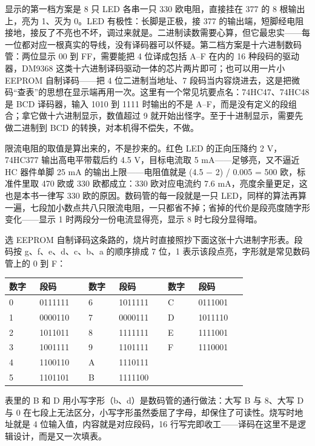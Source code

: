 显示的第一档方案是 8 只 LED 各串一只 330 欧电阻，直接挂在 377 的 8 根输出上，亮为 1、灭为 0。LED 有极性：长脚是正极，接 377 的输出端，短脚经电阻接地，接反了不亮也不坏，调过来就是。二进制读数需要心算，但它最忠实——每一位都对应一根真实的导线，没有译码器可以怀疑。第二档方案是十六进制数码管：两位显示 00 到 FF，需要能把 4 位译成包括 A–F 在内的 16 种段码的驱动器，DM9368 这类十六进制译码驱动一体的芯片两片即可；也可以用一片小 EEPROM 自制译码——把 4 位二进制当地址、7 段码当内容烧进去，这是把微码“查表”的思想在显示端再用一次。这里有一个常见坑要点名：74HC47、74HC48 是 BCD 译码器，输入 1010 到 1111 时输出的不是 A–F，而是没有定义的段组合；拿它做十六进制显示，数值超过 9 就开始出怪字。至于十进制显示，需要先做二进制到 BCD 的转换，对本机得不偿失，不做。

限流电阻的取值是算出来的，不是抄来的。红色 LED 的正向压降约 2 V，74HC377 输出高电平带载后约 4.5 V，目标电流取 5 mA——足够亮，又不逼近 HC 器件单脚 25 mA 的输出上限——电阻值就是 (4.5 − 2) / 0.005 = 500 欧，标准件里取 470 欧或 330 欧都成立：330 欧对应电流约 7.6 mA，亮度余量更足，这也是本书一律写 330 欧的原因。数码管的每一段就是一只 LED，同样的算法再算一遍，七段加小数点共八只限流电阻，一只都省不掉；省掉的代价是段亮度随字形变化——显示 1 时两段分一份电流显得亮，显示 8 时七段分显得暗。

选 EEPROM 自制译码这条路的，烧片时直接照抄下面这张十六进制字形表。段码按 g、f、e、d、c、b、a 的顺序排成 7 位，1 表示该段点亮，字形就是常见数码管上的 0 到 F：

\begin{longtable}{L{0.10\linewidth}L{0.16\linewidth}L{0.10\linewidth}L{0.16\linewidth}L{0.10\linewidth}L{0.16\linewidth}}
\toprule
数字 & 段码 & 数字 & 段码 & 数字 & 段码 \\
 & 0111111 & 6 & 1011111 & C & 0111001 \\
1 & 0000110 & 7 & 0000111 & D & 1011110 \\
2 & 1011011 & 8 & 1111111 & E & 1111001 \\
3 & 1001111 & 9 & 1101111 & F & 1110001 \\
4 & 1100110 & A & 1110111 & & \\
5 & 1101101 & B & 1111100 & & \\
\bottomrule
\end{longtable}

表里的 B 和 D 用小写字形（b、d）是数码管的通行做法：大写 B 与 8、大写 D 与 0 在七段上无法区分，小写字形虽然委屈了字母，却保住了可读性。烧写时地址就是 4 位输入值，内容就是对应段码，16 行写完即收工——译码在这里不是逻辑设计，而是又一次填表。

